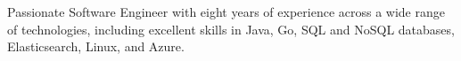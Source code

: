 \begin{cv}{}
  \begin{center}
    \begin{varwidth}[t]{0.8\linewidth}
      \raggedright Passionate Software Engineer with eight years of
      experience across a wide range of technologies, including
      excellent skills in Java, Go, SQL and NoSQL databases,
      Elasticsearch, Linux, and Azure.
    \end{varwidth}
  \end{center}



  \vspace{0.15cm}


\end{cv}

